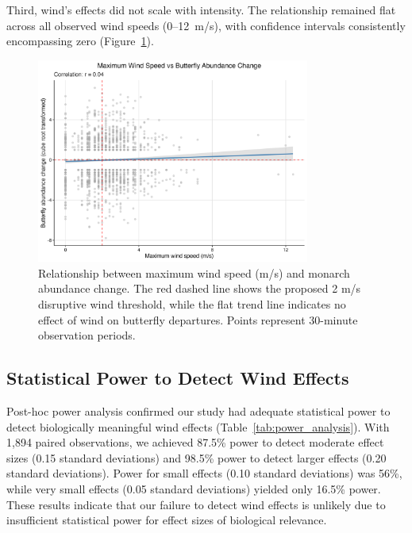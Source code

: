 Third, wind's effects did not scale with intensity. The relationship remained flat across all observed wind speeds (0–12~m/s), with confidence intervals consistently encompassing zero (Figure~\ref{fig:wind_scatter}).

\begin{figure}[htbp]
\centering
\includegraphics[width=0.8\textwidth]{figures/results/wind_hypothesis_scatter.png}
\caption{Relationship between maximum wind speed (m/s) and monarch abundance change. The red dashed line shows the proposed 2 m/s disruptive wind threshold, while the flat trend line indicates no effect of wind on butterfly departures. Points represent 30-minute observation periods.}\label{fig:wind_scatter}
\end{figure}

\subsection{Statistical Power to Detect Wind Effects}

Post-hoc power analysis confirmed our study had adequate statistical power to detect biologically meaningful wind effects (Table~\ref{tab:power_analysis}). With 1,894 paired observations, we achieved 87.5\% power to detect moderate effect sizes (0.15 standard deviations) and 98.5\% power to detect larger effects (0.20 standard deviations). Power for small effects (0.10 standard deviations) was 56\%, while very small effects (0.05 standard deviations) yielded only 16.5\% power. These results indicate that our failure to detect wind effects is unlikely due to insufficient statistical power for effect sizes of biological relevance.



